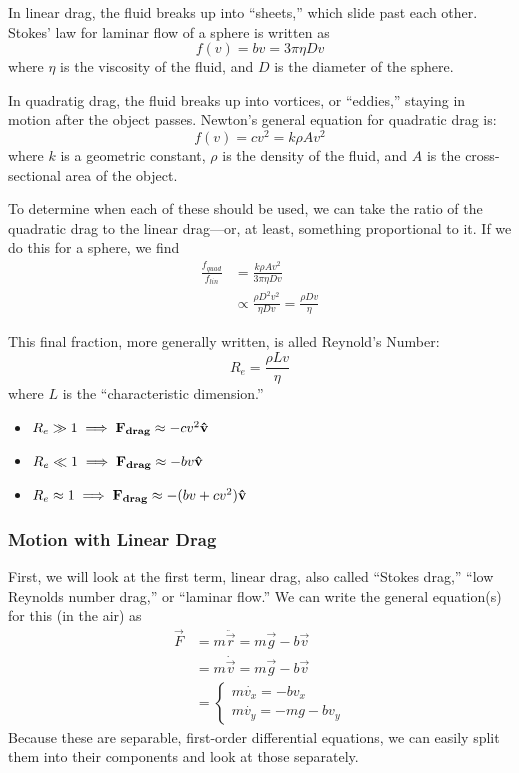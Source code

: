 \documentclass[a4paper]{article}
\begin{document}
In linear drag, the fluid breaks up into ``sheets,'' which slide past each
other. Stokes' law for laminar flow of a sphere is written as
\[f(v) = bv = 3\pi\eta Dv\]
where $\eta$ is the viscosity of the fluid, and $D$ is the diameter of the
sphere.

In quadratig drag, the fluid breaks up into vortices, or ``eddies,'' staying
in motion after the object passes. Newton's general equation for
quadratic drag is:
\[
    f(v) = cv^2 = k\rho Av^2
\]
where $k$ is a geometric constant, $\rho$ is the density of the fluid, and
$A$ is the cross-sectional area of the object.

To determine when each of these should be used, we can take the ratio
of the quadratic drag to the linear drag---or, at least, something
proportional to it. If we do this for a sphere, we find
\begin{align*}
    \frac{f_{quad}}{f_{lin}} &= \frac{k\rho Av^2}{3\pi\eta Dv}\\
    &\propto \frac{\rho D^2v^2}{\eta Dv} = \frac{\rho Dv}{\eta}
\end{align*}

This final fraction, more generally written, is alled Reynold's Number:
\[
    R_{e} = \frac{\rho L v}{\eta}    
\]
where $L$ is the ``characteristic dimension.''
\begin{itemize}
    \item $R_e \gg 1 \implies \boldsymbol{\mathbf{F_{drag}}} \approx -cv^2\boldsymbol{\mathbf{\hat{v}}}$
    \item $R_e \ll 1 \implies \boldsymbol{\mathbf{F_{drag}}} \approx -bv\boldsymbol{\mathbf{\hat{v}}}$
    \item $R_e \approx 1 \implies \boldsymbol{\mathbf{F_{drag}}} \approx -(bv+cv^2)\boldsymbol{\mathbf{\hat{v}}}$
\end{itemize}

\subsubsection{Motion with Linear Drag}
First, we will look at the first term, linear drag, also called ``Stokes drag,''
``low Reynolds number drag,'' or ``laminar flow.'' We can write the general
equation(s) for this (in the air) as
\begin{align*}
    \vec{F} &= m\ddot{\vec{r}} = m\vec{g} - b\vec{v}\\
            &= m\dot{\vec{v}} = m\vec{g}-b\vec{v}\\
            &=\begin{cases}
                m\dot{v_x} = -bv_x\\
                m\dot{v_y} = -mg-bv_y
            \end{cases}
\end{align*}
Because these are separable, first-order differential equations, we can easily
split them into their components and look at those separately.
\end{document}
